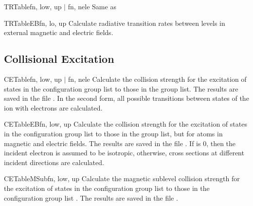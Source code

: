 \begin{fundesc}{TRTable}{fn, low, up $\mid$ fn, nele }
Same as 
\end{fundesc}

\begin{fundesc}{TRTableEB}{fn, lo, up}
Calculate radiative transition rates between levels in external magnetic and
electric fields.
\end{fundesc}


\subsection{Collisional Excitation}

\begin{fundesc}{CETable}{fn, low, up $\mid$ fn, nele}
Calculate the collision strength for the excitation of states in the
configuration group list  to those in the group list. The
results are saved in the file . In the second form, all possible
transitions between states of the ion with  electrons are calculated.
\end{fundesc}

\begin{fundesc}{CETableEB}{fn, low, up}
Calculate the collision strength for the excitation of states in the
configuration group list  to those in the group list, but for
atoms in magnetic and electric fields. The
results are saved in the file . If  is 0, then the incident
electron is assumed to be isotropic, otherwise, cross sections at different
incident directions are calculated.
\end{fundesc}

\begin{fundesc}{CETableMSub}{fn, low, up}
Calculate the magnetic sublevel collision strength for the excitation of states
in the configuration group list  to those in the configuration group
list . The results are saved in the file .
\end{fundesc}

